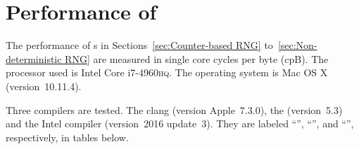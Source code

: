 %
%
%
%

\chapter{Performance of \texorpdfstring{}{RNG}}
\label{chap:Performance of RNG}

The performance of \rng{}s in Sections~\ref{sec:Counter-based RNG}
to~\ref{sec:Non-deterministic RNG} are measured in single core cycles per byte
(cpB). The processor used is Intel Core i7-4960\textsc{hq}. The operating
system is Mac OS X (version~10.11.4).

Three compilers are tested. The \llvm clang (version Apple~7.3.0), the \gnu{}
\gcc (version~5.3) and the Intel \cpp compiler (version~2016 update~3). They
are labeled ``\llvm'', ``\gcc'', and ``\icc'', respectively, in tables below.

